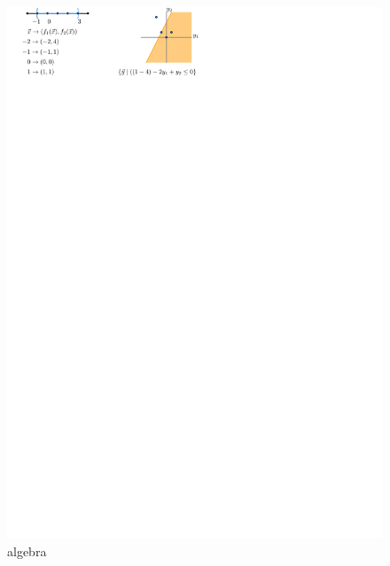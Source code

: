 \documentclass[a4paper, UKenglish]{lipics-v2018}
\begin{document}
\begin{figure}[h]
    \centering
    \includegraphics{../algebraic}
    \caption{algebra}
    \label{fig:algebraic}
\end{figure}
\end{document}
